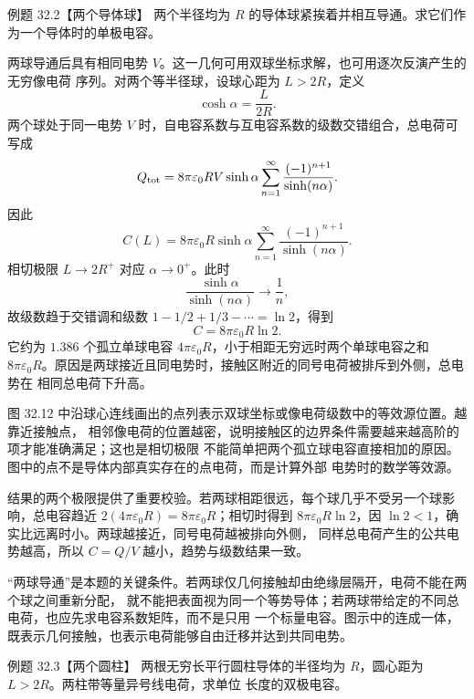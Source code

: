 \Needspace{0.38\textheight}
\begin{origexamplebox}{例题 32.2【两个导体球】}
两个半径均为 $R$ 的导体球紧挨着并相互导通。求它们作为一个导体时的单极电容。
\end{origexamplebox}

\begin{xesolution}
两球导通后具有相同电势 $V$。这一几何可用双球坐标求解，也可用逐次反演产生的无穷像电荷
序列。对两个等半径球，设球心距为 $L>2R$，定义
\[
  \cosh\alpha=\frac{L}{2R}.
\]
两个球处于同一电势 $V$ 时，自电容系数与互电容系数的级数交错组合，总电荷可写成
\begin{equation}
  Q_{\rm tot}=8\pi\varepsilon_0RV\sinh\alpha
  \sum_{n=1}^{\infty}\frac{(-1)^{n+1}}{\sinh(n\alpha)}.
\end{equation}
因此
\[
  C(L)=8\pi\varepsilon_0R\sinh\alpha
  \sum_{n=1}^{\infty}\frac{(-1)^{n+1}}{\sinh(n\alpha)}.
\]
相切极限 $L\to2R^+$ 对应 $\alpha\to0^+$。此时
\[
  \frac{\sinh\alpha}{\sinh(n\alpha)}\longrightarrow\frac1n,
\]
故级数趋于交错调和级数 $1-1/2+1/3-\cdots=\ln2$，得到
\begin{equation}
  \boxed{C=8\pi\varepsilon_0R\ln2}.
\end{equation}
它约为 $1.386$ 个孤立单球电容 $4\pi\varepsilon_0R$，小于相距无穷远时两个单球电容之和
$8\pi\varepsilon_0R$。原因是两球接近且同电势时，接触区附近的同号电荷被排斥到外侧，总电势在
相同总电荷下升高。

\touchingSpheresDiagram

图 32.12 中沿球心连线画出的点列表示双球坐标或像电荷级数中的等效源位置。越靠近接触点，
相邻像电荷的位置越密，说明接触区的边界条件需要越来越高阶的项才能准确满足；这也是相切极限
不能简单把两个孤立球电容直接相加的原因。图中的点不是导体内部真实存在的点电荷，而是计算外部
电势时的数学等效源。

结果的两个极限提供了重要校验。若两球相距很远，每个球几乎不受另一个球影响，总电容趋近
$2(4\pi\varepsilon_0R)=8\pi\varepsilon_0R$；相切时得到
$8\pi\varepsilon_0R\ln2$，因 $\ln2<1$，确实比远离时小。两球越接近，同号电荷越被排向外侧，
同样总电荷产生的公共电势越高，所以 $C=Q/V$ 越小，趋势与级数结果一致。

“两球导通”是本题的关键条件。若两球仅几何接触却由绝缘层隔开，电荷不能在两个球之间重新分配，
就不能把表面视为同一个等势导体；若两球带给定的不同总电荷，也应先求电容系数矩阵，而不是只用
一个标量电容。图示中的连成一体，既表示几何接触，也表示电荷能够自由迁移并达到共同电势。
\end{xesolution}

\Needspace{0.18\textheight}
\begin{origexamplebox}{例题 32.3【两个圆柱】}
两根无穷长平行圆柱导体的半径均为 $R$，圆心距为 $L>2R$。两柱带等量异号线电荷，求单位
长度的双极电容。
\end{origexamplebox}

